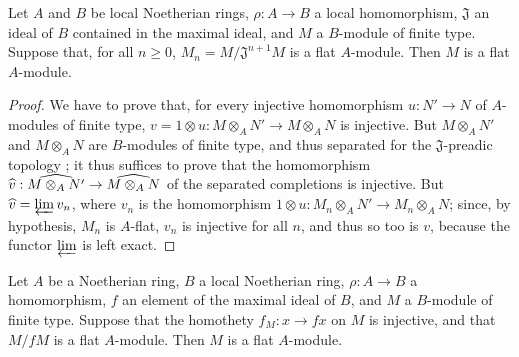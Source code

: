 \begin{proposition}[10.2.6]
\label{0.10.2.6}
Let $A$ and $B$ be local Noetherian rings, $\rho:A\to B$ a local homomorphism, $\mathfrak{J}$ an ideal of $B$ contained in the maximal ideal, and $M$ a $B$-module of finite type.
Suppose that, for all $n\geq0$, $M_n=M/\mathfrak{J}^{n+1}M$ is a flat $A$-module.
Then $M$ is a flat $A$-module.
\end{proposition}

\begin{proof}
\label{proof-0.10.2.6}
We have to prove that, for every injective homomorphism $u:N'\to N$ of $A$-modules of finite type, $v=1\otimes u:M\otimes_A N'\to M\otimes_A N$ is injective.
But $M\otimes_A N'$ and $M\otimes_A N$ are $B$-modules of finite type, and thus separated for the $\mathfrak{J}$-preadic topology ;
it thus suffices to prove that the homomorphism $\wh{v}:\wh{M\otimes_A N'}\to\wh{M\otimes_A N}$ of the separated completions is injective.
But ${\widehat{v}}=\varprojlim v_n$, where $v_n$ is the homomorphism $1\otimes u:M_n\otimes_A N'\to M_n\otimes_A N$;
since, by hypothesis, $M_n$ is $A$-flat, $v_n$ is injective for all $n$, and thus so too is $v$, because the functor $\varprojlim$ is left exact.
\end{proof}

\begin{corollary}[10.2.7]
\label{0.10.2.7}
Let $A$ be a Noetherian ring, $B$ a local Noetherian ring, $\rho:A\to B$ a homomorphism, $f$ an element of the maximal ideal of $B$, and $M$ a $B$-module of finite type.
Suppose that the homothety $f_M:x\to fx$ on $M$ is injective, and that $M/fM$ is a flat $A$-module.
Then $M$ is a flat $A$-module.
\end{corollary}

